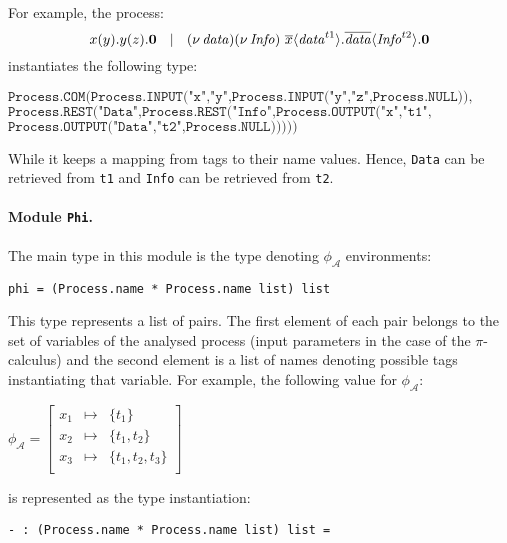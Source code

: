 \documentclass[10pt,a4paper,final,oneside,fleqn]{book}
\begin{document}
\noindent
For example, the process:
\[x(y).y(z).{\bf 0}~~\mid~~(\nu~\!\mbox{{\itshape data\/}})(\nu~\!\mbox{{\itshape Info\/}})~\overline{x}\langle\mbox{{\itshape data\/}}^{t1}\rangle.\overline{\mbox{{\itshape data\/}}}\langle\mbox{{\itshape Info\/}}^{t2}\rangle.{\bf 0}\]
instantiates the following type:\vspace{6mm}

\noindent
$\texttt{Process.COM(Process.INPUT("x","y",Process.INPUT("y","z",Process.NULL)),}$\\
$\texttt{Process.REST("Data",Process.REST("Info",Process.OUTPUT("x","t1",}$\\
$\texttt{Process.OUTPUT("Data","t2",Process.NULL)))))}$\vspace{6mm}

\noindent
While it keeps a mapping from tags to their name values.  Hence, \texttt{Data} can be retrieved from \texttt{t1} and \texttt{Info} can be retrieved from \texttt{t2}.
\paragraph{Module \texttt{Phi}.}  The main type in this module is the type denoting $\phi_\mathcal{A}$ environments:\vspace{6mm}

\noindent
\texttt{phi = (Process.name * Process.name list) list}\vspace{6mm}

\noindent
This type represents a list of pairs.  The first element of each pair belongs to the set of variables of the analysed process (input parameters in the case of the $\pi$-calculus) and the second element is a list of names denoting possible tags instantiating that variable.  For example, the following value for $\phi_\mathcal{A}$:\vspace{6mm}

\noindent
$\phi_\mathcal{A}=\left[\begin{array}{lcr}
x_1&\mapsto&\{t_1\}\\
x_2&\mapsto&\{t_1,t_2\}\\
x_3&\mapsto&\{t_1,t_2,t_3\}\\
\end{array}\right]$\vspace{6mm}

\noindent
is represented as the type instantiation:\vspace{6mm}

\noindent
\texttt{- : (Process.name * Process.name list) list =}
\end{document}
